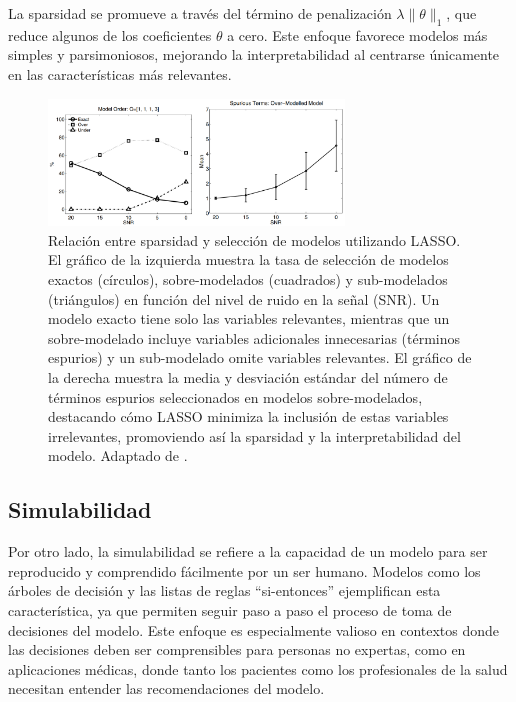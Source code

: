 La sparsidad se promueve a través del término de penalización \(\lambda \|\theta\|_1\), que reduce algunos de los coeficientes \(\theta\) a cero. Este enfoque favorece modelos más simples y parsimoniosos, mejorando la interpretabilidad al centrarse únicamente en las características más relevantes.

\begin{figure}[H]
    \centering
    \includegraphics[width=0.7\textwidth]{include/lasso.png}
    \caption{Relación entre sparsidad y selección de modelos utilizando LASSO. El gráfico de la izquierda muestra la tasa de selección de modelos exactos (círculos), sobre-modelados (cuadrados) y sub-modelados (triángulos) en función del nivel de ruido en la señal (SNR). Un modelo exacto tiene solo las variables relevantes, mientras que un sobre-modelado incluye variables adicionales innecesarias (términos espurios) y un sub-modelado omite variables relevantes. El gráfico de la derecha muestra la media y desviación estándar del número de términos espurios seleccionados en modelos sobre-modelados, destacando cómo LASSO minimiza la inclusión de estas variables irrelevantes, promoviendo así la sparsidad y la interpretabilidad del modelo. Adaptado de \cite{kukreja2006least}.}
    \label{fig:lasso}
\end{figure}


\subsection{Simulabilidad}

Por otro lado, la simulabilidad se refiere a la capacidad de un modelo para ser reproducido y comprendido fácilmente por un ser humano. Modelos como los árboles de decisión y las listas de reglas ``si-entonces'' ejemplifican esta característica, ya que permiten seguir paso a paso el proceso de toma de decisiones del modelo. Este enfoque es especialmente valioso en contextos donde las decisiones deben ser comprensibles para personas no expertas, como en aplicaciones médicas, donde tanto los pacientes como los profesionales de la salud necesitan entender las recomendaciones del modelo.

